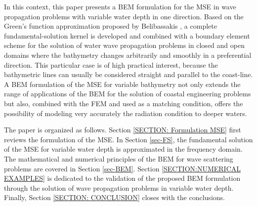 In this context, this paper presents a BEM formulation for the MSE in wave propagation problems with variable water depth in one direction. Based on the Green's function approximation proposed by Belibassakis \cite{Belibassakis2000}, a complete fundamental-solution kernel is developed and combined with a boundary element scheme for the solution of water wave propagation problems in closed and open domains where the bathymetry changes arbitrarily and smoothly in a preferential direction. This particular case is of high practical interest, because the bathymetric lines can usually be considered straight and parallel to the coast-line. A BEM formulation of the MSE for variable bathymetry not only extends the range of applications of the BEM for the solution of coastal engineering problems but also, combined with the FEM and used as a matching condition, offers the possibility of modeling very accurately the radiation condition to deeper waters.

The paper is organized as follows. Section \ref{SECTION: Formulation MSE} first reviews the formulation of the MSE. In Section \ref{sec-FS}, the fundamental solution of the MSE for variable water depth is approximated in the frequency domain. The mathematical and numerical principles of the BEM for wave scattering problems are covered in Section \ref{sec-BEM}. Section \ref{SECTION:NUMERICAL EXAMPLES} is dedicated to the validation of the proposed BEM formulation through the solution of wave propagation problems in variable water depth. Finally, Section \ref{SECTION: CONCLUSION} closes with the conclusions.

